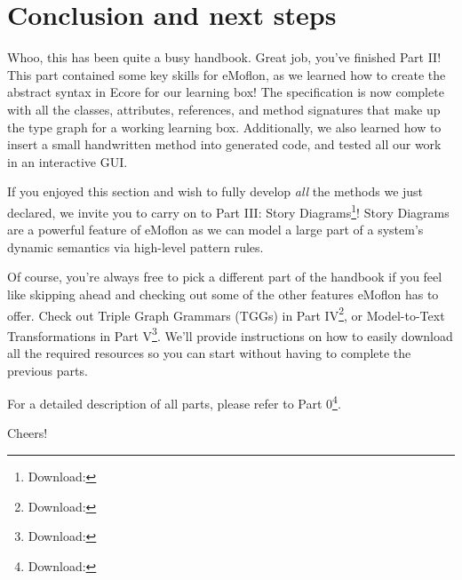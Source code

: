 \newpage
\section{Conclusion and next steps}
\genHeader

\vspace{0.5cm}

Whoo, this has been quite a busy handbook. Great job, you've finished Part II! This part contained some key skills for eMoflon, as we learned how to create
the abstract syntax in Ecore for our learning box! The specification is now complete with all the classes, attributes, references, and
method signatures that make up the type graph for a working learning box. Additionally, we also learned how to insert a small handwritten method into generated
code, and tested all our work in an interactive GUI.

If you enjoyed this section and wish to fully develop \emph{all} the methods we just declared, we invite you to carry on to Part III: Story
Diagrams\footnote{Download: \dlPartThree}! Story Diagrams are a powerful feature of eMoflon as we can model a large part of a system's dynamic semantics via high-level pattern rules. 


Of course, you're always free to pick a different part of the handbook if you feel like skipping ahead and checking out some of the other features eMoflon has
to offer. Check out Triple Graph Grammars (TGGs)  in Part IV\footnote{Download: \dlPartFour}, or Model-to-Text Transformations in Part V\footnote{Download: \dlPartFive}. We'll provide instructions on how to easily download
all the required resources so you can start without having to complete the previous parts.

For a detailed description of all parts, please refer to Part 0\footnote{Download: \dlPartZero}.

\vspace{1.0cm}

Cheers!